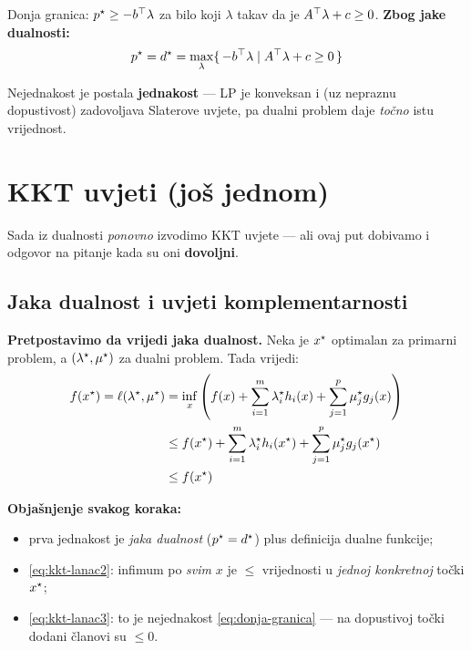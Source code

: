Donja granica: $p^{\star} \ge -b^{\top}\lambda$ za bilo koji $\lambda$ takav da je
$A^{\top}\lambda + c \ge 0$. \textbf{Zbog jake dualnosti:}
\[
p^{\star} = d^{\star} = \max_\lambda\{\, -b^{\top}\lambda \mid A^{\top}\lambda + c \ge 0 \,\}
\]

Nejednakost je postala \textbf{jednakost} --- LP je konveksan i (uz nepraznu
dopustivost) zadovoljava Slaterove uvjete, pa dualni problem daje \emph{točno}
istu vrijednost.

\section{KKT uvjeti (još jednom)}
\label{sec:kkt-opet}

Sada iz dualnosti \emph{ponovno} izvodimo KKT uvjete --- ali ovaj put dobivamo i
odgovor na pitanje kada su oni \textbf{dovoljni}.

\subsection{Jaka dualnost i uvjeti komplementarnosti}

\textbf{Pretpostavimo da vrijedi jaka dualnost.} Neka je $x^{\star}$ optimalan za
primarni problem, a $(\lambda^{\star}, \mu^{\star})$ za dualni problem. Tada vrijedi:
\begin{align}
f(x^{\star}) = \ell(\lambda^{\star},\mu^{\star})
&= \inf_x\left(f(x) + \sum_{i=1}^{m}\lambda_i^{\star} h_i(x)
              + \sum_{j=1}^{p}\mu_j^{\star} g_j(x)\right)
  \label{eq:kkt-lanac1}\\
&\le f(x^{\star}) + \sum_{i=1}^{m}\lambda_i^{\star} h_i(x^{\star})
              + \sum_{j=1}^{p}\mu_j^{\star} g_j(x^{\star})
  \label{eq:kkt-lanac2}\\
&\le f(x^{\star})
  \label{eq:kkt-lanac3}
\end{align}

\textbf{Objašnjenje svakog koraka:}

\begin{itemize}
  \item prva jednakost je \emph{jaka dualnost} ($p^{\star} = d^{\star}$) plus definicija
        dualne funkcije;
  \item \eqref{eq:kkt-lanac2}: infimum po \emph{svim} $x$ je $\le$ vrijednosti u
        \emph{jednoj konkretnoj} točki $x^{\star}$;
  \item \eqref{eq:kkt-lanac3}: to je nejednakost \eqref{eq:donja-granica} --- na
        dopustivoj točki dodani članovi su $\le 0$.
\end{itemize}

